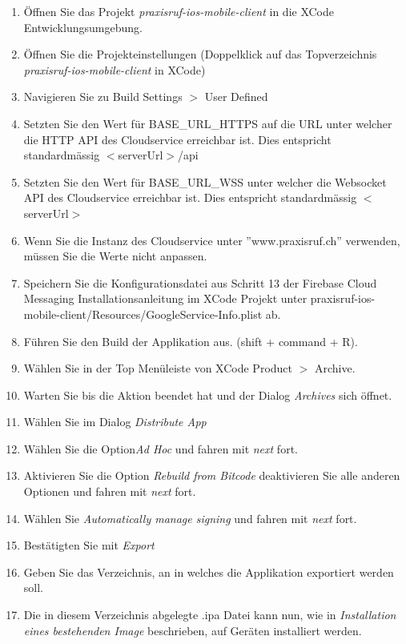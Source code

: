 \begin{enumerate}
    \item Öffnen Sie das Projekt \textit{praxisruf-ios-mobile-client} in die XCode Entwicklungsumgebung.
    \item Öffnen Sie die Projekteinstellungen (Doppelklick auf das Topverzeichnis \textit{praxisruf-ios-mobile-client} in XCode)
    \item Navigieren Sie zu Build Settings $>$ User Defined
    \item Setzten Sie den Wert für BASE\_URL\_HTTPS auf die URL unter welcher die HTTP API des Cloudservice erreichbar ist. Dies entspricht standardmässig $<$serverUrl$>$/api
    \item Setzten Sie den Wert für BASE\_URL\_WSS unter welcher die Websocket API des Cloudservice erreichbar ist. Dies entspricht standardmässig $<$serverUrl$>$
    \item Wenn Sie die Instanz des Cloudservice unter ''www.praxisruf.ch'' verwenden, müssen Sie die Werte nicht anpassen.
    \item Speichern Sie die Konfigurationsdatei aus Schritt 13 der Firebase Cloud Messaging Installationsanleitung im XCode Projekt unter praxisruf-ios-mobile-client/Resources/GoogleService-Info.plist ab.
    \item Führen Sie den Build der Applikation aus. (shift + command + R).
    \item Wählen Sie in der Top Menüleiste von XCode Product $>$ Archive.
    \item Warten Sie bis die Aktion beendet hat und der Dialog \textit{Archives} sich öffnet.
    \item Wählen Sie im Dialog \textit{Distribute App}
    \item Wählen Sie die Option\textit{Ad Hoc} und fahren mit \textit{next} fort.
    \item Aktivieren Sie die Option \textit{Rebuild from Bitcode} deaktivieren Sie alle anderen Optionen und fahren mit \textit{next} fort.
    \item Wählen Sie \textit{Automatically manage signing} und fahren mit \textit{next} fort.
    \item Bestätigten Sie mit \textit{Export}
    \item Geben Sie das Verzeichnis, an in welches die Applikation exportiert werden soll.
    \item Die in diesem Verzeichnis abgelegte .ipa Datei kann nun, wie in \textit{Installation eines bestehenden Image} beschrieben, auf Geräten installiert werden.
\end{enumerate}


\clearpage
